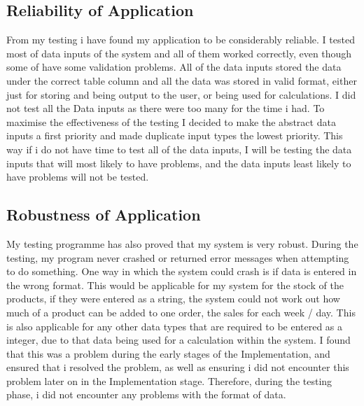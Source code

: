 \subsection{Reliability of Application}

From my testing i have found my application to be considerably reliable. I tested most of data inputs of the system and all of them worked correctly, even though some of have some validation problems. All of the data inputs stored the data under the correct table column and all the data was stored in valid format, either just for storing and being output to the user, or being used for  calculations. I did not test all the Data inputs as there were too many for the time i had. To maximise the effectiveness of the testing I decided to make the abstract data inputs a first priority and made duplicate input types the lowest priority. This way if i do not have time to test all of the data inputs, I will  be testing the data inputs that will most likely to have problems, and the data inputs least likely to have problems will not be tested. 

\subsection{Robustness of Application}

My testing programme has also proved that my system is very robust. During the testing, my program never crashed or returned error messages when attempting to do something. One way in which the system could crash is if data is entered in the wrong format. This would be applicable for my system for the stock of the products, if they were entered as a string, the system could not work out how much of a product can be added to one order, the sales for each week / day. This is also applicable for any other data types that are required to be entered as a integer, due to that data being used for a calculation within the system. I found that this was a problem during the early stages of the Implementation, and ensured that i resolved the problem, as well as ensuring i did not encounter this problem later on in the Implementation stage. Therefore, during the testing phase, i did not encounter any problems with the format of data.

